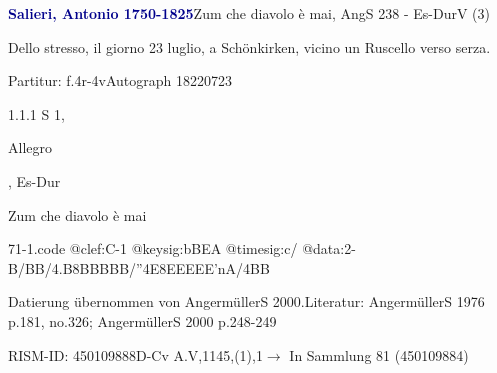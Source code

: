 \documentclass[a4paper, twocolumn, 11pt]{book}
\begin{document}
\par \vspace{16pt} \textcolor{darkblue}{\textbf{Salieri, Antonio  1750-1825}}\hfillplus{[71]}\newline Zum che diavolo è mai, AngS 238 - Es-Dur\newline V (3)
\par \begin{itshape} Dello stresso, il giorno 23 luglio, a Schönkirken, vicino un Ruscello verso serza.\end{itshape} 
\par \textcolor{darkblue}{}  Partitur: f.4r-4v\newline Autograph  18220723
\par 1.1.1  S 1, \begin{itshape}Allegro\end{itshape}, Es-Dur\newline \begin{footnotesize} Zum che diavolo è mai \end{footnotesize}  
\begin{filecontents*}{71-1.code}
@clef:C-1
@keysig:bBEA
@timesig:c/
@data:2-B/BB/4.B8BBBBB/''4E8EEEEE'nA/4BB
\end{filecontents*}
\newline %
\par Datierung übernommen von AngermüllerS 2000.\newline Literatur: AngermüllerS 1976  p.181, no.326; AngermüllerS 2000  p.248-249
\par RISM-ID: 450109888\newline D-Cv  A.V,1145,(1),1\newline $\rightarrow$ In Sammlung 81 (450109884)
      
\end{document}
